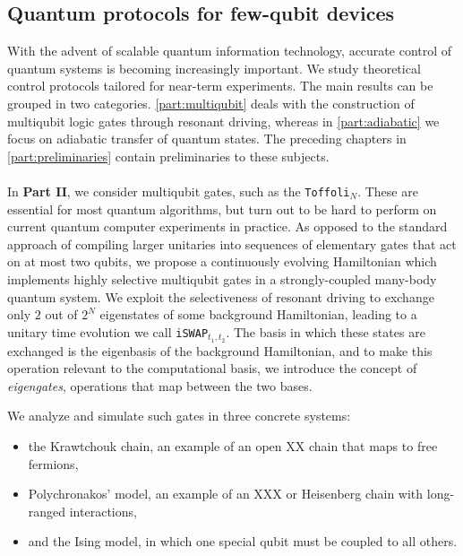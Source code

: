 
\subsection*{Quantum protocols for few-qubit devices}

With the advent of scalable quantum information technology, accurate control of quantum systems is becoming increasingly important. We study theoretical control protocols tailored for  near-term experiments. The main results can be grouped in two categories. \cref{part:multiqubit} deals with the construction of multiqubit logic gates through resonant driving, whereas in \cref{part:adiabatic} we focus on adiabatic transfer of quantum states. The preceding chapters in \cref{part:preliminaries} contain preliminaries to these subjects. 

\paragraph{} In \textbf{Part II}, we consider multiqubit gates, such as the \texttt{Toffoli}$_N$. These are essential for most quantum algorithms, but turn out to be hard to perform on current quantum computer experiments in practice.  As opposed to the standard approach of compiling larger unitaries into sequences of elementary gates that act on at most two qubits, we propose a continuously evolving Hamiltonian which implements highly selective multiqubit gates in a strongly-coupled many-body quantum system. We exploit the selectiveness of resonant driving to exchange only $2$ out of $2^N$ eigenstates of some background Hamiltonian, leading to a unitary time evolution we call \texttt{iSWAP}$_{t_1,t_2}$. The basis in which these states are exchanged is the eigenbasis of the background Hamiltonian, and to make this operation relevant to the computational basis, we introduce the concept of \emph{eigengates}, operations that map between the two bases. 

We analyze and simulate such gates in three concrete systems: 
\begin{itemize}
\item the Krawtchouk chain, an example of an open XX chain that maps to free fermions,
\item Polychronakos' model, an example of an XXX or Heisenberg chain with long-ranged interactions,
\item and the Ising model, in which one special qubit must be coupled to all others.
\end{itemize}

